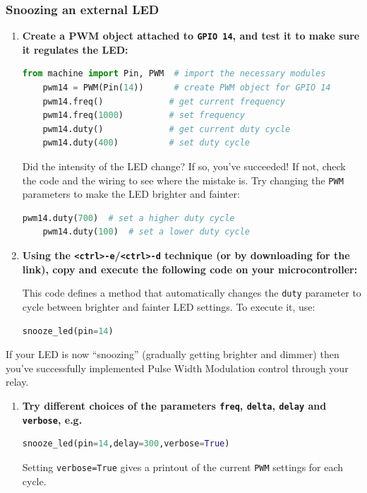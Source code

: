 \subsubsection{\howto Snoozing an external LED}
\begin{enumerate}
	\item \textbf{Create a PWM object attached to \texttt{GPIO 14}, and test it to make sure it regulates the LED:}
	\begin{lstlisting}[language=Python]
	from machine import Pin, PWM  # import the necessary modules
	pwm14 = PWM(Pin(14))      # create PWM object for GPIO 14
	pwm14.freq()             # get current frequency
	pwm14.freq(1000)         # set frequency
	pwm14.duty()             # get current duty cycle
	pwm14.duty(400)          # set duty cycle
	\end{lstlisting}
	Did the intensity of the LED change?
	If so, you've succeeded!
	If not, check the code and the wiring to see where the mistake is.
	\smallskip
	Try changing the \texttt{PWM} parameters to make the LED brighter and fainter:
	\begin{lstlisting}[language=Python]
	pwm14.duty(700)  # set a higher duty cycle
	pwm14.duty(100)  # set a lower duty cycle
	\end{lstlisting}
	\item \textbf{Using the \texttt{<ctrl>-e}/\texttt{<ctrl>-d} technique (or by downloading for the link), copy and execute the following code on your microcontroller:}
	

	This code defines a method that automatically changes the \texttt{duty} parameter to cycle between brighter and fainter LED settings.
	To execute it, use:
	\begin{lstlisting}[language=Python]
	snooze_led(pin=14)
	\end{lstlisting}
\end{enumerate}
If your LED is now “snoozing” (gradually getting brighter and dimmer) then you’ve successfully implemented Pulse Width Modulation control through your relay.
\begin{enumerate}[resume]
	\item \textbf{Try different choices of the parameters \texttt{freq}, \texttt{delta}, \texttt{delay} and \texttt{verbose}, e.g.}
	\begin{lstlisting}[language=Python]
	snooze_led(pin=14,delay=300,verbose=True)
	\end{lstlisting}
	Setting \lstinline{verbose=True} gives a printout of the current \texttt{PWM} settings for each cycle.
\end{enumerate}

